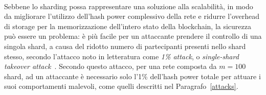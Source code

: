\paragraph*{}
Sebbene lo sharding possa rappresentare una soluzione alla scalabilità, in modo da migliorare l'utilizzo dell'hash power complessivo della rete e ridurre l'overhead di storage per la memorizzazione dell'intero stato della blockchain, la sicurezza può essere un problema: è più facile per un attaccante prendere il controllo di una singola shard, a causa del ridotto numero di partecipanti presenti nello shard stesso, secondo l'attacco noto in letteratura come \emph{1\% attack}, o \emph{single-shard  takeover attack}~\cite{chauhan2018blockchain}. Secondo questo attacco, per una rete composta da $m=100$ shard, ad un attaccante è necessario solo l'1\% dell'hash power totale per attuare i suoi comportamenti malevoli, come quelli descritti nel Paragrafo~\ref{attacks}.